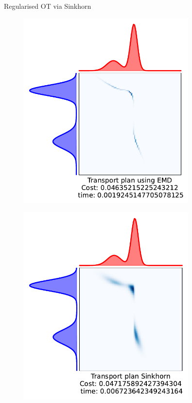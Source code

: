 \documentclass[pdf,aspectratio=169,10pt]{beamer}
\begin{document}
\begin{frame}{ Regularised OT via Sinkhorn}

\begin{minipage}{0.49\textwidth}  
\begin{figure}
        \includegraphics[width=0.8\textwidth]{../img/EMD_vs_S1.pdf}\hspace{2em}
    \end{figure}
\end{minipage}
\hfill
\begin{minipage}{0.49\textwidth}
\begin{figure}
        \includegraphics[width=0.8\textwidth]{../img/EMD_vs_S2.pdf}\hspace{2em}
    \end{figure}
\end{minipage}


\end{frame}
\end{document}

